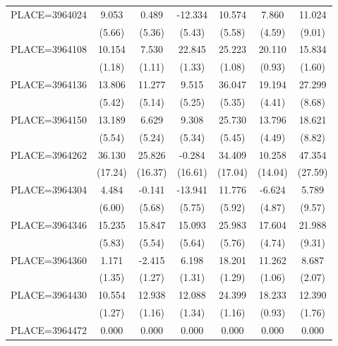 {\begin{tabular}{l*{6}{c}}
PLACE=3964024       &       9.053&       0.489&     -12.334&      10.574&       7.860&      11.024\\
                    &      (5.66)&      (5.36)&      (5.43)&      (5.58)&      (4.59)&      (9.01)\\
PLACE=3964108       &      10.154&       7.530&      22.845&      25.223&      20.110&      15.834\\
                    &      (1.18)&      (1.11)&      (1.33)&      (1.08)&      (0.93)&      (1.60)\\
PLACE=3964136       &      13.806&      11.277&       9.515&      36.047&      19.194&      27.299\\
                    &      (5.42)&      (5.14)&      (5.25)&      (5.35)&      (4.41)&      (8.68)\\
PLACE=3964150       &      13.189&       6.629&       9.308&      25.730&      13.796&      18.621\\
                    &      (5.54)&      (5.24)&      (5.34)&      (5.45)&      (4.49)&      (8.82)\\
PLACE=3964262       &      36.130&      25.826&      -0.284&      34.409&      10.258&      47.354\\
                    &     (17.24)&     (16.37)&     (16.61)&     (17.04)&     (14.04)&     (27.59)\\
PLACE=3964304       &       4.484&      -0.141&     -13.941&      11.776&      -6.624&       5.789\\
                    &      (6.00)&      (5.68)&      (5.75)&      (5.92)&      (4.87)&      (9.57)\\
PLACE=3964346       &      15.235&      15.847&      15.093&      25.983&      17.604&      21.988\\
                    &      (5.83)&      (5.54)&      (5.64)&      (5.76)&      (4.74)&      (9.31)\\
PLACE=3964360       &       1.171&      -2.415&       6.198&      18.201&      11.262&       8.687\\
                    &      (1.35)&      (1.27)&      (1.31)&      (1.29)&      (1.06)&      (2.07)\\
PLACE=3964430       &      10.554&      12.938&      12.088&      24.399&      18.233&      12.390\\
                    &      (1.27)&      (1.16)&      (1.34)&      (1.16)&      (0.93)&      (1.76)\\
PLACE=3964472       &       0.000&       0.000&       0.000&       0.000&       0.000&       0.000\\

\end{tabular}}
